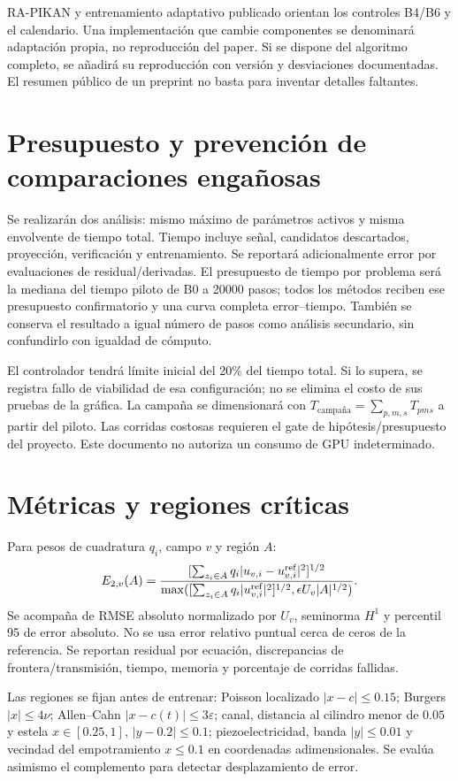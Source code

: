 RA-PIKAN y entrenamiento adaptativo publicado orientan los controles B4/B6 y el calendario. Una implementación que cambie componentes se denominará adaptación propia, no reproducción del paper. Si se dispone del algoritmo completo, se añadirá su reproducción con versión y desviaciones documentadas. El resumen público de un preprint no basta para inventar detalles faltantes.

\section{Presupuesto y prevención de comparaciones engañosas}
Se realizarán dos análisis: mismo máximo de parámetros activos y misma envolvente de tiempo total. Tiempo incluye señal, candidatos descartados, proyección, verificación y entrenamiento. Se reportará adicionalmente error por evaluaciones de residual/derivadas. El presupuesto de tiempo por problema será la mediana del tiempo piloto de B0 a 20000 pasos; todos los métodos reciben ese presupuesto confirmatorio y una curva completa error--tiempo. También se conserva el resultado a igual número de pasos como análisis secundario, sin confundirlo con igualdad de cómputo.

El controlador tendrá límite inicial del 20\% del tiempo total. Si lo supera, se registra fallo de viabilidad de esa configuración; no se elimina el costo de sus pruebas de la gráfica. La campaña se dimensionará con $T_{\text{campaña}}=\sum_{p,m,s}T_{pms}$ a partir del piloto. Las corridas costosas requieren el gate de hipótesis/presupuesto del proyecto. Este documento no autoriza un consumo de GPU indeterminado.

\section{Métricas y regiones críticas}
Para pesos de cuadratura $q_i$, campo $v$ y región $A$:
\begin{equation}E_{2,v}(A)=\frac{[\sum_{z_i\in A}q_i|u_{v,i}-u_{v,i}^{\rm ref}|^2]^{1/2}}{\max([\sum_{z_i\in A}q_i|u_{v,i}^{\rm ref}|^2]^{1/2},\epsilon U_v|A|^{1/2})}.\end{equation}
Se acompaña de RMSE absoluto normalizado por $U_v$, seminorma $H^1$ y percentil 95 de error absoluto. No se usa error relativo puntual cerca de ceros de la referencia. Se reportan residual por ecuación, discrepancias de frontera/transmisión, tiempo, memoria y porcentaje de corridas fallidas.

Las regiones se fijan antes de entrenar: Poisson localizado $|x-c|\leq0.15$; Burgers $|x|\leq4\nu$; Allen--Cahn $|x-c(t)|\leq3\varepsilon$; canal, distancia al cilindro menor de $0.05$ y estela $x\in[0.25,1]$, $|y-0.2|\leq0.1$; piezoelectricidad, banda $|y|\leq0.01$ y vecindad del empotramiento $x\leq0.1$ en coordenadas adimensionales. Se evalúa asimismo el complemento para detectar desplazamiento de error.

